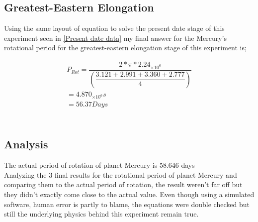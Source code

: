 \documentclass[11pt]{article}
\begin{document}
\begin{multicols}{2}

\subsection{Greatest-Eastern Elongation}\label{Greatest-Eastern Elongation}

Using the same layout of equation to solve the present date stage of this experiment seen in \cref{Present date data} my final answer for the Mercury's rotational period for the greatest-eastern elongation stage of this experiment is;

\begin{equation} \label{3-Planet rotational period}
\begin{split}
{P_{Rot} =\dfrac{2 * \pi * 2.24_{\times10^6}}{\left(\dfrac{3.121+2.991+3.360+2.777}{4}\right)}} \\
= 4.870_{\times10^6}s \\
= 56.37 Days \\
\end{split}
\end{equation} \\


\subsection{Analysis}

The actual period of rotation of planet Mercury is 58.646 days \cite{The_Solar_System} \\

Analyzing the 3 final results for the rotational period of planet Mercury and comparing them to the actual period of rotation, the result weren't far off but they didn't exactly come close to the actual value. Even though using a simulated software, human error is partly to blame, the equations were double checked but still the underlying physics behind this experiment remain true.



\end{multicols}
\end{document}
